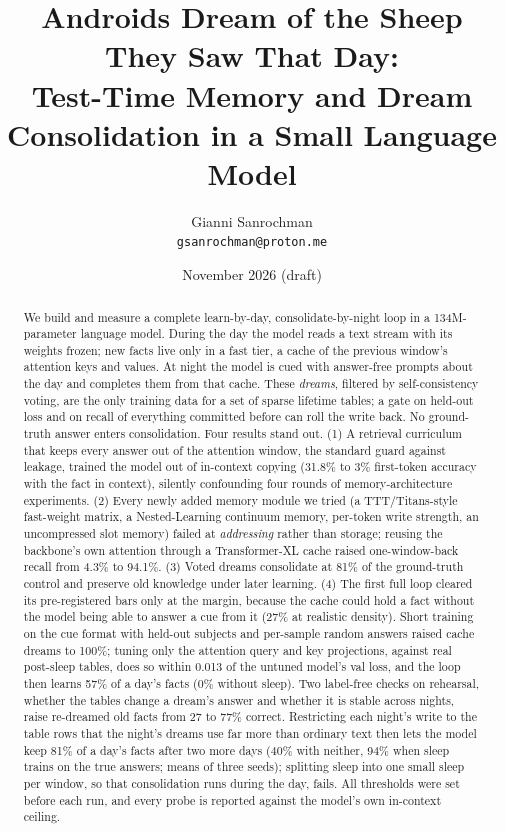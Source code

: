 \documentclass[11pt]{article}
\title{Androids Dream of the Sheep They Saw That Day:\\
Test-Time Memory and Dream Consolidation in a Small Language Model}
\author{Gianni Sanrochman\\\texttt{gsanrochman@proton.me}}
\date{November 2026 \quad (draft)}
\begin{document}
\maketitle

\begin{abstract}
We build and measure a complete learn-by-day, consolidate-by-night loop in a
134M-parameter language model. During the day the model reads a text stream
with its weights frozen; new facts live only in a fast tier, a cache of the
previous window's attention keys and values. At night the model is cued with
answer-free prompts about the day and completes them from that cache. These
\emph{dreams}, filtered by self-consistency voting, are the only training
data for a set of sparse lifetime tables; a gate on held-out loss and on
recall of everything committed before can roll the write back. No ground-truth
answer enters consolidation. Four results stand out. (1) A retrieval
curriculum that keeps every answer out of the attention window, the standard
guard against leakage, trained the model out of in-context copying (31.8\% to
3\% first-token accuracy with the fact in context), silently confounding four
rounds of memory-architecture experiments. (2) Every newly added memory module
we tried (a TTT/Titans-style fast-weight matrix, a Nested-Learning continuum
memory, per-token write strength, an uncompressed slot memory) failed at
\emph{addressing} rather than storage; reusing the backbone's own attention
through a Transformer-XL cache raised one-window-back recall from 4.3\% to
94.1\%. (3) Voted dreams consolidate at 81\% of the ground-truth control and
preserve old knowledge under later learning. (4) The first full loop cleared
its pre-registered bars only at the margin, because the cache could hold a fact
without the model being able to answer a cue from it (27\% at realistic
density). Short training on the cue format with held-out subjects and
per-sample random answers raised cache dreams to 100\%; tuning only the
attention query and key projections, against real post-sleep tables, does so
within 0.013 of the untuned model's val loss, and the loop then learns 57\% of a day's
facts (0\% without sleep). Two label-free checks on rehearsal, whether the
tables change a dream's answer and whether it is stable across nights, raise
re-dreamed old facts from 27 to 77\% correct. Restricting each night's write to
the table rows that the night's dreams use far more than ordinary text then
lets the model keep 81\% of a day's facts after two more days (40\% with
neither, 94\% when sleep trains on the true answers; means of three seeds);
splitting sleep into one small sleep per window, so that consolidation
runs during the day, fails. All
thresholds were set before each run, and every probe is reported against the
model's own in-context ceiling.
\end{abstract}
\end{document}
